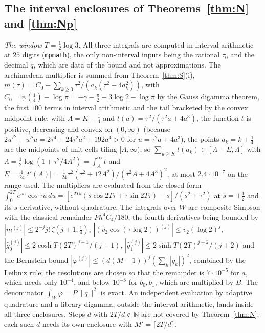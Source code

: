 \documentclass[11pt]{amsart}
\theoremstyle{definition}
\theoremstyle{remark}
\newcommand{\N}{\mathbb N}
\newcommand{\gh}[1]{\widehat g_{#1}}
\begin{document}
\subsection{The interval enclosures of Theorems~\ref{thm:N} and \ref{thm:Np}}
\emph{The window $T=\frac12\log3$.} All three integrals are computed in interval arithmetic at $25$ digits
(\texttt{mpmath}), the only non-interval inputs being the rational $\tau_0$ and the decimal $q$, which
are data of the bound and not approximations. The archimedean multiplier is summed from
Theorem~\ref{thm:S}(i), $m(\tau)=C_0+\sum_{k\ge0}\tau^2/(a_k(\tau^2+4a_k^2))$, with
$C_0=\psi(\frac14)-\log\pi=-\gamma-\frac\pi2-3\log2-\log\pi$ by the Gauss digamma theorem, the first
$100$ terms in interval arithmetic and the tail bracketed by the convex midpoint rule: with $A=K-\frac14$
and $t(a)=\tau^2/(\tau^2a+4a^3)$, the function $t$ is positive, decreasing and convex on $(0,\infty)$
(because $2u'^2-u''u=2\tau^4+24\tau^2a^2+192a^4>0$ for $u=\tau^2a+4a^3$), the points $a_k=k+\frac14$
are the midpoints of unit cells tiling $[A,\infty)$, so
$\sum_{k\ge K}t(a_k)\in[\Lambda-E,\Lambda]$ with $\Lambda=\frac12\log(1+\tau^2/4A^2)=\int_A^\infty t$
and $E=\frac1{24}|t'(A)|=\frac1{24}\tau^2(\tau^2+12A^2)/(\tau^2A+4A^3)^2$, at most $2.4\cdot10^{-7}$
on the range used. The multipliers are evaluated from the closed form
$\int_0^{2T}e^{su}\cos\tau u\,du=[e^{2Ts}(s\cos2T\tau+\tau\sin2T\tau)-s]/(s^2+\tau^2)$ at
$s=\pm\frac12$ and its $s$-derivative, without quadrature. The integrals over $W$ are composite
Simpson with the classical remainder $Ph^4C_4/180$, the fourth derivatives being bounded by
$|m^{(j)}|\le2^{-j}j!\,\zeta(j+1,\frac14)$, $|(v_2\cos(\tau\log2))^{(j)}|\le v_2(\log2)^j$,
$|\gh0^{(j)}|\le2\cosh T(2T)^{j+1}/(j+1)$, $|\gh1^{(j)}|\le2\sinh T(2T)^{j+2}/(j+2)$ and the Bernstein
bound $|\varphi^{(j)}|\le(d(M-1))^j(\sum_k|q_k|)^2$, combined by the Leibniz rule; the resolutions are
chosen so that the remainder is $7\cdot10^{-5}$ for $a$, which needs only $10^{-4}$, and below
$10^{-8}$ for $b_0,b_1$, which are multiplied by $B$. The denominator $\int_W\varphi=P\|q\|^2$ is
exact. An independent evaluation by adaptive quadrature and a library digamma, outside the interval
arithmetic, lands inside all three enclosures. Steps $d$ with $2T/d\notin\N$ are not covered by
Theorem~\ref{thm:N}: each such $d$ needs its own enclosure with $M'=\lceil2T/d\rceil$.
\end{document}
